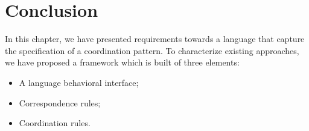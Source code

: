 \section{Conclusion}
In this chapter, we have presented requirements towards a language that capture the specification of a coordination pattern. To characterize existing approaches, we have proposed a framework which is built of three elements:

\begin{itemize}
	\item A language behavioral interface;
	\item Correspondence rules;
	\item Coordination rules.
\end{itemize}


